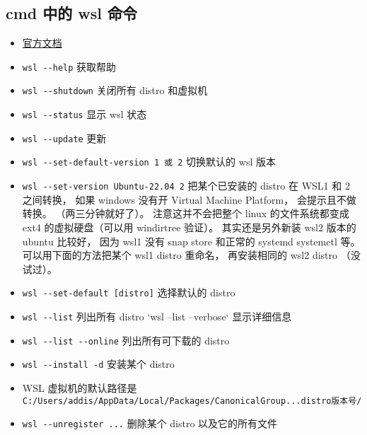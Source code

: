 
\begin{issues}
\issueDraft
\end{issues}

\subsection{cmd 中的 wsl 命令}
\begin{itemize}
\item \href{https://docs.microsoft.com/en-us/windows/wsl/}{官方文档}
\item \verb`wsl --help` 获取帮助
\item \verb`wsl --shutdown` 关闭所有 distro 和虚拟机
\item \verb`wsl --status` 显示 wsl 状态
\item \verb`wsl --update` 更新
\item \verb`wsl --set-default-version 1 或 2` 切换默认的 wsl 版本
\item \verb`wsl --set-version Ubuntu-22.04 2` 把某个已安装的 distro 在 WSL1 和 2 之间转换， 如果 windows 没有开 Virtual Machine Platform， 会提示且不做转换。 （两三分钟就好了）。 注意这并不会把整个 linux 的文件系统都变成 ext4 的虚拟硬盘（可以用 windirtree 验证）。 其实还是另外新装 wsl2 版本的 ubuntu 比较好， 因为 wsl1 没有 snap store 和正常的 systemd systemctl 等。 可以用下面的方法把某个 wsl1 distro 重命名， 再安装相同的 wsl2 distro （没试过）。
\item \verb`wsl --set-default [distro]` 选择默认的 distro
\item \verb`wsl --list` 列出所有 distro `wsl --list --verbose` 显示详细信息
\item \verb`wsl --list --online` 列出所有可下载的 distro
\item \verb`wsl --install -d` 安装某个 distro
\item WSL 虚拟机的默认路径是 \verb`C:/Users/addis/AppData/Local/Packages/CanonicalGroup...distro版本号/`
\item \verb`wsl --unregister ...` 删除某个 distro 以及它的所有文件


\end{itemize}
